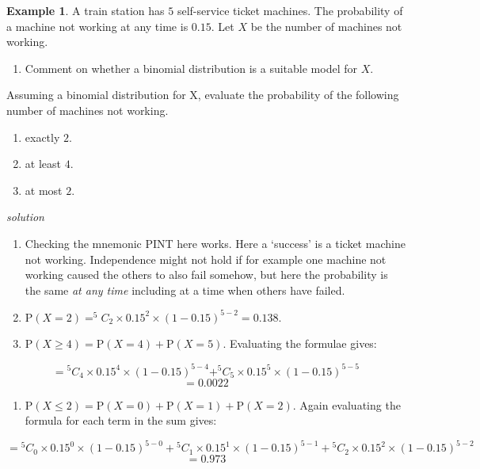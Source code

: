 \documentclass[
]{book}
\providecommand{\tightlist}{%
  \setlength{\itemsep}{0pt}\setlength{\parskip}{0pt}}
\theoremstyle{definition}
\theoremstyle{definition}
\newtheorem{example}{Example}[chapter]
\theoremstyle{definition}
\theoremstyle{definition}
\theoremstyle{remark}
\begin{document}
\begin{example}
A train station has \(5\) self-service ticket machines. The probability of a machine not working at any time is \(0.15\). Let \(X\) be the number of machines not working.

\begin{enumerate}
\def\labelenumi{\alph{enumi})}
\tightlist
\item
  Comment on whether a binomial distribution is a suitable model for \(X\).
\end{enumerate}

Assuming a binomial distribution for X, evaluate the probability of the following number of machines not working.

\begin{enumerate}
\def\labelenumi{\alph{enumi})}
\setcounter{enumi}{1}
\item
  exactly \(2\).
\item
  at least \(4\).
\item
  at most \(2\).
\end{enumerate}

\emph{solution}

\begin{enumerate}
\def\labelenumi{\alph{enumi})}
\item
  Checking the mnemonic PINT here works. Here a `success' is a ticket machine not working. Independence might not hold if for example one machine not working caused the others to also fail somehow, but here the probability is the same \emph{at any time} including at a time when others have failed.
\item
  \(\text{P}(X=2) = ^5C_2 \times 0.15^2 \times (1-0.15)^{5-2} = 0.138\).
\item
  \(\text{P}(X\geq 4) = \text{P}(X=4) + \text{P}(X=5)\). Evaluating the formulae gives:
\end{enumerate}

\[= {}^5C_4 \times 0.15^4 \times (1-0.15)^{5-4}+ ^5C_5 \times 0.15^5 \times (1-0.15)^{5-5}\]
\[= 0.0022\]

\begin{enumerate}
\def\labelenumi{\alph{enumi})}
\setcounter{enumi}{3}
\tightlist
\item
  \(\text{P}(X\leq 2) = \text{P}(X=0) + \text{P}(X=1) + \text{P}(X=2)\). Again evaluating the formula for each term in the sum gives:
\end{enumerate}

\[= {}^5C_0 \times 0.15^0 \times (1-0.15)^{5-0}+ {}^5C_1 \times 0.15^1 \times (1-0.15)^{5-1}+ {}^5C_2 \times 0.15^2 \times (1-0.15)^{5-2}\]
\[ = 0.973 \]
\end{example}
\end{document}
